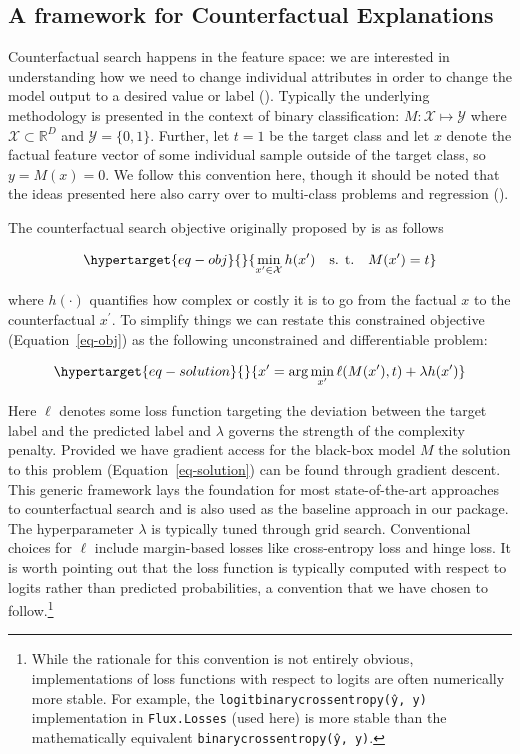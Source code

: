 \documentclass[
  letterpaper,
  DIV=11,
  numbers=noendperiod]{scrartcl}
\begin{document}
\hypertarget{sec-method}{%
\subsection{A framework for Counterfactual
Explanations}\label{sec-method}}

Counterfactual search happens in the feature space: we are interested in
understanding how we need to change individual attributes in order to
change the model output to a desired value or label
(\cite{molnar2020interpretable}). Typically the underlying methodology
is presented in the context of binary classification:
\(M: \mathcal{X} \mapsto \mathcal{Y}\) where
\(\mathcal{X}\subset\mathbb{R}^D\) and \(\mathcal{Y}=\{0,1\}\). Further,
let \(t=1\) be the target class and let \(x\) denote the factual feature
vector of some individual sample outside of the target class, so
\(y=M(x)=0\). We follow this convention here, though it should be noted
that the ideas presented here also carry over to multi-class problems
and regression (\cite{molnar2020interpretable}).

The counterfactual search objective originally proposed by
\cite{wachter2017counterfactual} is as follows

\begin{equation}\protect\hypertarget{eq-obj}{}{
\min_{x^\prime \in \mathcal{X}} h(x^\prime) \ \ \ \mbox{s. t.} \ \ \ M(x^\prime) = t
}\label{eq-obj}\end{equation}

where \(h(\cdot)\) quantifies how complex or costly it is to go from the
factual \(x\) to the counterfactual \(x^\prime\). To simplify things we
can restate this constrained objective (Equation~\ref{eq-obj}) as the
following unconstrained and differentiable problem:

\begin{equation}\protect\hypertarget{eq-solution}{}{
x^\prime = \arg \min_{x^\prime}  \ell(M(x^\prime),t) + \lambda h(x^\prime)
}\label{eq-solution}\end{equation}

Here \(\ell\) denotes some loss function targeting the deviation between
the target label and the predicted label and \(\lambda\) governs the
strength of the complexity penalty. Provided we have gradient access for
the black-box model \(M\) the solution to this problem
(Equation~\ref{eq-solution}) can be found through gradient descent. This
generic framework lays the foundation for most state-of-the-art
approaches to counterfactual search and is also used as the baseline
approach in our package. The hyperparameter \(\lambda\) is typically
tuned through grid search. Conventional choices for \(\ell\) include
margin-based losses like cross-entropy loss and hinge loss. It is worth
pointing out that the loss function is typically computed with respect
to logits rather than predicted probabilities, a convention that we have
chosen to follow.\footnote{While the rationale for this convention is
  not entirely obvious, implementations of loss functions with respect
  to logits are often numerically more stable. For example, the
  \texttt{logitbinarycrossentropy(ŷ,\ y)} implementation in
  \texttt{Flux.Losses} (used here) is more stable than the
  mathematically equivalent \texttt{binarycrossentropy(ŷ,\ y)}.}
\end{document}
